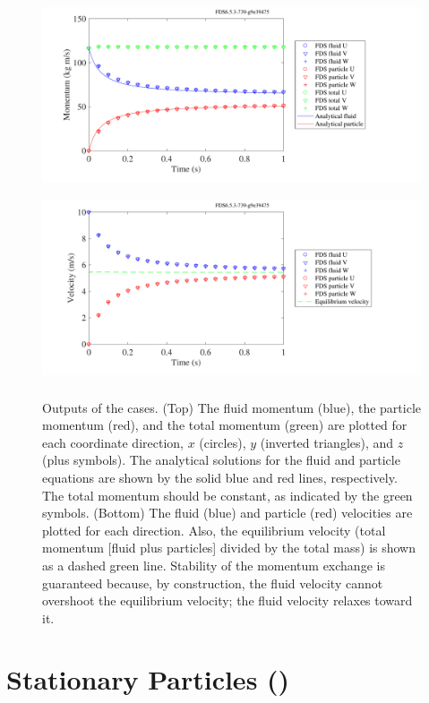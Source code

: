 \documentclass[11pt]{book}
\begin{document}
\begin{figure}[h]
\begin{center}
\includegraphics[height=2.2in]{SCRIPT_FIGURES/fluid_part_momentum}\\
\includegraphics[height=2.2in]{SCRIPT_FIGURES/fluid_part_velocity}
\caption[Test of fluid-particle momentum transfer for nonstationary particles]{Outputs of the  cases.  (Top) The fluid momentum (blue), the particle momentum (red), and the total momentum (green) are plotted for each coordinate direction, $x$ (circles), $y$ (inverted triangles), and $z$ (plus symbols).  The analytical solutions for the fluid and particle equations are shown by the solid blue and red lines, respectively. The total momentum should be constant, as indicated by the green symbols. (Bottom) The fluid (blue) and particle (red) velocities are plotted for each direction.  Also, the equilibrium velocity (total momentum [fluid plus particles] divided by the total mass) is shown as a dashed green line.  Stability of the momentum exchange is guaranteed because, by construction, the fluid velocity cannot overshoot the equilibrium velocity; the fluid velocity relaxes toward it.}
\label{fig_fluid_part_mom}
\end{center}
\end{figure}

\clearpage

\newpage

\section{Stationary Particles (\texorpdfstring{}{particle\_drag})}
\label{particle_drag}
\end{document}
